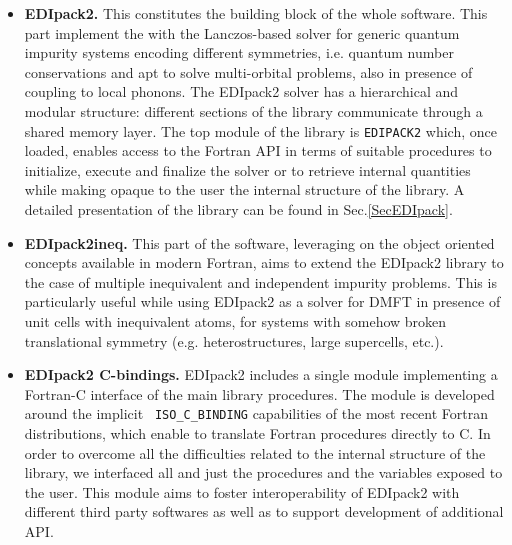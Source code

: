 \documentclass[preprint,3p,10pt]{elsarticle}
\def\NAME{{\rm EDIpack2 }}
\begin{document}
\begin{itemize}
\item{\bf EDIpack2.}
This constitutes the  building block of the whole software. This part
implement the  with the Lanczos-based solver for generic quantum
impurity systems encoding different symmetries, i.e. quantum number
conservations and apt to solve multi-orbital problems, also in
presence of coupling to local phonons.  
The \NAME solver has a hierarchical and modular structure: different
sections of the library communicate through a shared memory layer. The
top module of the library is {\tt EDIPACK2} which, once loaded,
enables access to the Fortran API in terms of suitable procedures to
initialize, execute and finalize the solver or to retrieve internal
quantities while making opaque to the user the internal structure of
the library. 
A detailed presentation of the library can be found in
Sec.\ref{SecEDIpack}. 


\item{\bf EDIpack2ineq.}
This part of the software, leveraging on the object oriented concepts
available in modern Fortran, aims to extend the \NAME library to the
case of multiple inequivalent and independent impurity problems. This
is particularly useful while using \NAME as a solver for DMFT in
presence of unit cells with inequivalent atoms, for systems with
somehow broken translational symmetry (e.g. heterostructures, large
supercells, etc.).


\item{\bf EDIpack2 C-bindings.}
\NAME includes a single module implementing a Fortran-C interface of the main
library procedures. The module is developed around the implicit {\tt
  ISO\_C\_BINDING} capabilities of the most recent Fortran
distributions, which enable to translate Fortran procedures directly
to C. In order to overcome all the difficulties related to the internal
structure of the library,  we interfaced all and just the
procedures and the variables exposed to the user. 
This module aims to foster interoperability of \NAME  with different
third party softwares as well as to support development of additional
API. 




\end{itemize}
\end{document}
